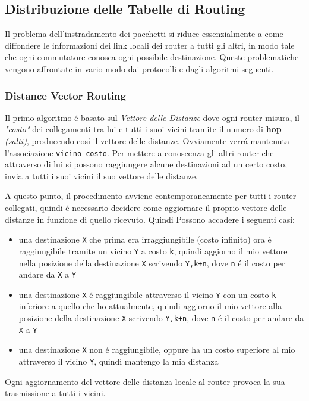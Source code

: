 \documentclass[12pt]{article}
\def\code#1{\texttt{#1}}
\begin{document}
\clearpage
\subsection{Distribuzione delle Tabelle di Routing}\label{router-distribuzione-tabelle-routing}
Il problema dell'instradamento dei pacchetti si riduce essenzialmente a come diffondere le informazioni dei link locali dei 
router a tutti gli altri, in modo tale che ogni commutatore conosca ogni possibile destinazione. Queste problematiche 
vengono affrontate in vario modo dai protocolli e dagli algoritmi seguenti.

\subsubsection{Distance Vector Routing}\label{router-distribuzione-tabelle-routing-distance-vector}
Il primo algoritmo \'e basato sul \textit{Vettore delle Distanze} dove ogni router misura, il \textit{"costo"} dei 
collegamenti tra lui e tutti i suoi vicini tramite il numero di \textbf{hop} \textit{(salti)}, producendo cos\'i il vettore 
delle distanze. Ovviamente verr\'a mantenuta l'associazione \code{vicino-costo}. Per mettere a conoscenza gli altri router 
che attraverso di lui si possono raggiungere alcune destinazioni ad un certo costo, invia a tutti i suoi vicini il suo 
vettore delle distanze.

A questo punto, il procedimento avviene contemporaneamente per tutti i router collegati, quindi \'e necessario decidere 
come aggiornare il proprio vettore delle distanze in funzione di quello ricevuto. Quindi Possono accadere i seguenti casi:
\begin{itemize}[noitemsep]
	\item una destinazione \code{X} che prima era irraggiungibile (costo infinito) ora \'e raggiungibile tramite un vicino 
	      \code{Y} a costo \code{k}, quindi aggiorno il mio vettore nella posizione della destinazione \code{X} scrivendo 
	      \code{{Y},{k+n}}, dove \code{n} \'e il costo per andare da \code{X} a \code{Y}
	\item una destinazione \code{X} \'e raggiungibile attraverso il vicino \code{Y} con un costo \code{k} inferiore a 
	      quello che ho attualmente, quindi aggiorno il mio vettore alla posizione della destinazione \code{X} scrivendo 
	      \code{{Y},{k+n}}, dove \code{n} \'e il costo per andare da \code{X} a \code{Y}
	\item una destinazione \code{X} non \'e raggiungibile, oppure ha un costo superiore al mio attraverso il vicino 
	      \code{Y}, quindi mantengo la mia distanza
\end{itemize}
Ogni aggiornamento del vettore delle distanza locale al router provoca la sua trasmissione a tutti i vicini.
\end{document}
